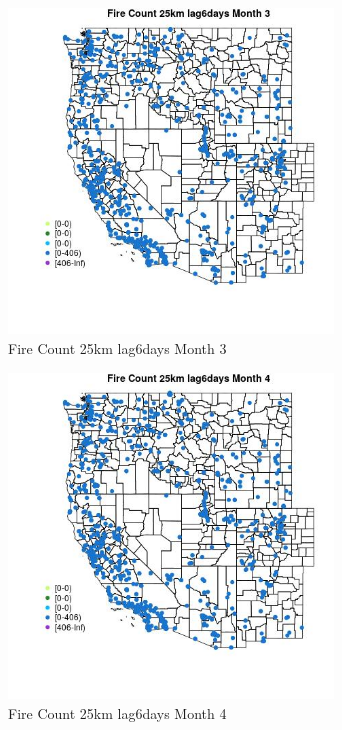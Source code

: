 \begin{figure} 
\centering  
\includegraphics[width=0.77\textwidth]{Code_Outputs/Report_ML_input_PM25_Step4_part_f_de_duplicated_aveswNAs_MapObsMo3Fire_Count_25km_lag6days.jpg} 
\caption{\label{fig:Report_ML_input_PM25_Step4_part_f_de_duplicated_aveswNAsMapObsMo3Fire_Count_25km_lag6days}Fire Count 25km lag6days Month 3} 
\end{figure} 
 

\begin{figure} 
\centering  
\includegraphics[width=0.77\textwidth]{Code_Outputs/Report_ML_input_PM25_Step4_part_f_de_duplicated_aveswNAs_MapObsMo4Fire_Count_25km_lag6days.jpg} 
\caption{\label{fig:Report_ML_input_PM25_Step4_part_f_de_duplicated_aveswNAsMapObsMo4Fire_Count_25km_lag6days}Fire Count 25km lag6days Month 4} 
\end{figure} 
 

